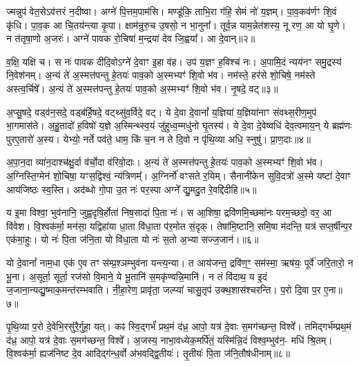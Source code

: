 ज्मन्नुप॑ वेत॒से\-ऽव॑त्तरं न॒दीष्वा। अग्ने॑ पि॒त्तम॒पाम॑सि। मण्डू॑कि॒ ताभि॒रा ग॑हि॒ सेमं नो॑ य॒ज्ञम्। पा॒व॒कव॑र्णꣳ शि॒वं कृ॑धि। पा॒व॒क आ चि॒तय॑न्त्या कृ॒पा। क्षाम॑न्रुरु॒च उ॒षसो॒ न भा॒नुना᳚। तूर्व॒न्न याम॒न्नेत॑शस्य॒ नू रण॒ आ यो घृ॒णे। न त॑तृषा॒णो अ॒जरः॑। अग्ने॑ पावक रो॒चिषा॑ म॒न्द्रया॑ देव जि॒ह्वया᳚। आ दे॒वान्॥२॥

व॒क्षि॒ यक्षि॑ च। स नः॑ पावक दीदि॒वो\-ऽग्ने॑ दे॒वाꣳ इ॒हा व॑ह। उप॑ य॒ज्ञꣳ ह॒विश्च॑ नः। अ॒पामि॒दं न्यय॑नꣳ समु॒द्रस्य॑ नि॒वेश॑नम्। अ॒न्यं ते॑ अ॒स्मत्त॑पन्तु हे॒तयः॑ पाव॒को अ॒स्मभ्यꣳ॑ शि॒वो भ॑व। नम॑स्ते॒ हर॑से शो॒चिषे॒ नम॑स्ते अस्त्व॒र्चिषे᳚। अ॒न्यं ते॑ अ॒स्मत्त॑पन्तु हे॒तयः॑ पाव॒को अ॒स्मभ्यꣳ॑ शि॒वो भ॑व। नृ॒षदे॒ वट्॥३॥

अ॒प्सु॒षदे॒ वड्व॑न॒सदे॒ वड्ब॑र्\mbox{}हि॒षदे॒ वट्थ्सु॑व॒र्विदे॒ वट्। ये दे॒वा दे॒वानां᳚ य॒ज्ञिया॑ य॒ज्ञिया॑नाꣳ संवथ्स॒रीण॒मुप॑ भा॒गमास॑ते। अ॒हु॒तादो॑ ह॒विषो॑ य॒ज्ञे अ॒स्मिन्थ्स्व॒यं जु॑हुध्व॒म्मधु॑नो घृ॒तस्य॑। ये दे॒वा दे॒वेष्वधि॑ देव॒त्वमाय॒न् ये ब्रह्म॑णः पुरए॒तारो॑ अ॒स्य। येभ्यो॒ नर्ते पव॑ते॒ धाम॒ किं च॒न न ते दि॒वो न पृ॑थि॒व्या अधि॒ स्नुषु॑। प्रा॒ण॒दाः॥४॥

अ॒पा॒न॒दा व्या॑न॒दाश्च॑क्षु॒र्दा व॑र्चो॒दा व॑रिवो॒दाः। अ॒न्यं ते॑ अ॒स्मत्त॑पन्तु हे॒तयः॑ पाव॒को अ॒स्मभ्यꣳ॑ शि॒वो भ॑व। अ॒ग्निस्ति॒ग्मेन॑ शो॒चिषा॒ यꣳस॒द्विश्वं॒ न्य॑त्रिणम्᳚। अ॒ग्निर्नो॑ वꣳसते र॒यिम्। सैनानी॑केन सुवि॒दत्रो॑ अ॒स्मे यष्टा॑ दे॒वाꣳ आय॑जिष्ठः स्व॒स्ति। अद॑ब्धो गो॒पा उ॒त नः॑ पर॒स्पा अग्ने᳚ द्यु॒मदु॒त रे॒वद्दि॑दीहि॥५॥

{\anuvakamend[{उप॑ दे॒वान् वट्प्रा॑ण॒दाश्चतु॑श्चत्वारिꣳशच्च॥१॥}]}

य इ॒मा विश्वा॒ भुव॑नानि॒ जुह्व॒दृषि॒र्\mbox{}होता॑ निष॒सादा॑ पि॒ता नः॑। स आ॒शिषा॒ द्रवि॑णमि॒च्छमा॑नः परम॒च्छदो॒ वर॒ आ वि॑वेश। वि॒श्वक॑र्मा॒ मन॑सा॒ यद्विहा॑या धा॒ता वि॑धा॒ता प॑र॒मोत सं॒दृक्। तेषा॑मि॒ष्टानि॒ समि॒षा म॑दन्ति॒ यत्र॑ सप्त॒र्\mbox{}षीन्प॒र एक॑मा॒हुः। यो नः॑ पि॒ता ज॑नि॒ता यो वि॑धा॒ता यो नः॑ स॒तो अ॒भ्या सज्ज॒जान॑।॥६॥

यो दे॒वानां᳚ नाम॒धा एक॑ ए॒व तꣳ स॑म्प्र॒श्ञम्भुव॑ना यन्त्य॒न्या। त आय॑जन्त॒ द्रवि॑ण॒ꣳ॒ सम॑स्मा॒ ऋष॑यः॒ पूर्वे॑ जरि॒तारो॒ न भू॒ना। अ॒सूर्ता॒ सूर्ता॒ रज॑सो वि॒माने॒ ये भू॒तानि॑ स॒मकृ॑ण्वन्नि॒मानि॑। न तं वि॑दाथ॒ य इ॒दं ज॒जाना॒न्यद्यु॒ष्माक॒मन्त॑रम्भवाति। नी॒हा॒रेण॒ प्रावृ॑ता॒ जल्प्या॑ चासु॒तृप॑ उक्थ॒शास॑श्चरन्ति। प॒रो दि॒वा प॒र ए॒ना॥७॥

पृ॒थि॒व्या प॒रो दे॒वेभि॒रसु॑रै॒र्गुहा॒ यत्। कꣴ स्वि॒द्गर्भं॑ प्रथ॒मं द॑ध्र॒ आपो॒ यत्र॑ दे॒वाः स॒मग॑च्छन्त॒ विश्वे᳚। तमिद्गर्भ॑म्प्रथ॒मं द॑ध्र॒ आपो॒ यत्र॑ दे॒वाः स॒मग॑च्छन्त॒ विश्वे᳚। अ॒जस्य॒ नाभा॒वध्येक॒मर्पि॑तं॒ यस्मि॑न्नि॒दं विश्व॒म्भुव॑न॒- मधि॑ श्रि॒तम्। वि॒श्वक॑र्मा॒ ह्यज॑निष्ट दे॒व आदिद्ग॑न्ध॒र्वो अ॑भवद्द्वि॒तीयः॑। तृ॒तीयः॑ पि॒ता ज॑नि॒तौष॑धीनाम्॥८॥

